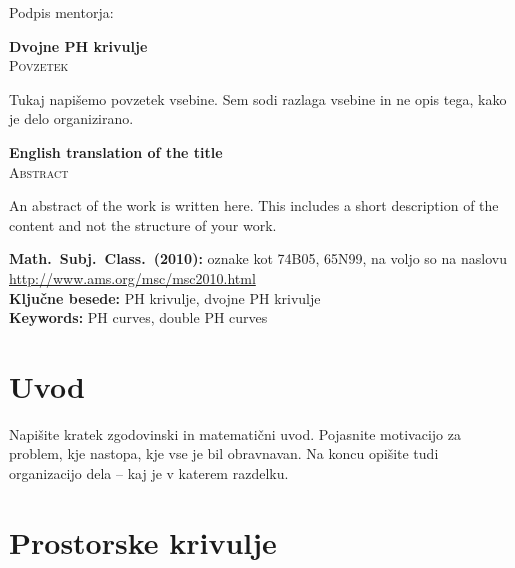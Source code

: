 \documentclass[12pt,a4paper,twoside]{article}
\newcommand{\naslovdela}{Dvojne PH krivulje}
\newcommand{\kljucnebesede}{PH krivulje\sep dvojne PH krivulje} %
\newcommand{\keywords}{PH curves\sep double PH curves} %
\newcommand{\sep}{, }  %
\theoremstyle{definition} %
\theoremstyle{plain} %
\theoremstyle{primerstyle}
\numberwithin{equation}{section}  %
\begin{document}
\vspace{2cm}
\hspace*{\fill} Podpis mentorja: \phantom{prostor za podpis}


\cleardoublepage
{}

\begin{center}
\textbf{\naslovdela} \\[3mm]
\textsc{Povzetek} \\[2mm]
\end{center}
Tukaj napišemo povzetek vsebine. Sem sodi razlaga vsebine in ne opis tega, kako je delo
organizirano.

\vfill
\begin{center}
\textbf{English translation of the title} \\[3mm] %
\textsc{Abstract}\\[2mm]
\end{center}

An abstract of the work is written here. This includes a short description of
the content and not the structure of your work.

\vfill\noindent
\textbf{Math.~Subj.~Class.~(2010):} oznake kot 74B05, 65N99, na voljo so na naslovu
\url{http://www.ams.org/msc/msc2010.html} \\[1mm]
\textbf{Ključne besede:} \kljucnebesede \\[1mm]
\textbf{Keywords:} \keywords

\cleardoublepage

\setcounter{page}{1}    %

\section{Uvod}

Napišite kratek zgodovinski in matematični uvod.  Pojasnite motivacijo za problem, kje
nastopa, kje vse je bil obravnavan. Na koncu opišite tudi organizacijo dela -- kaj je v
katerem razdelku.
\section{Prostorske krivulje}
\end{document}
